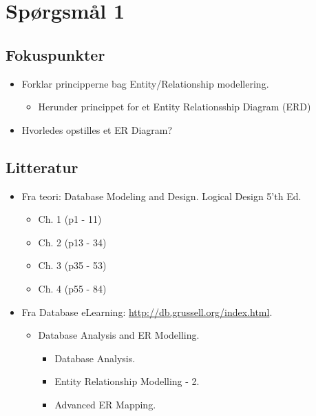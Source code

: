 \section{Spørgsmål 1}

\subsection{Fokuspunkter}
\begin{itemize}
	\item Forklar principperne bag Entity/Relationship modellering.
	\begin{itemize}
		\item Herunder princippet for et Entity Relationsship Diagram (ERD)
	\end{itemize}
	\item Hvorledes opstilles et ER Diagram?
\end{itemize}

\subsection{Litteratur}
\begin{itemize}
	
	\item Fra teori: Database Modeling and Design. Logical Design 5'th Ed.
	\begin{itemize}
		\item Ch. 1 (p1 - 11)
		\item Ch. 2 (p13 - 34)
		\item Ch. 3 (p35 - 53)
		\item Ch. 4 (p55 - 84)
	\end{itemize}
	
	\item Fra Database eLearning: \url{http://db.grussell.org/index.html}.
	\begin{itemize}
		\item Database Analysis and ER Modelling.
		\begin{itemize}
			\item Database Analysis.
			\item Entity Relationship Modelling - 2.
			\item Advanced ER Mapping.
		\end{itemize}
	\end{itemize}
	
%	
\end{itemize}

